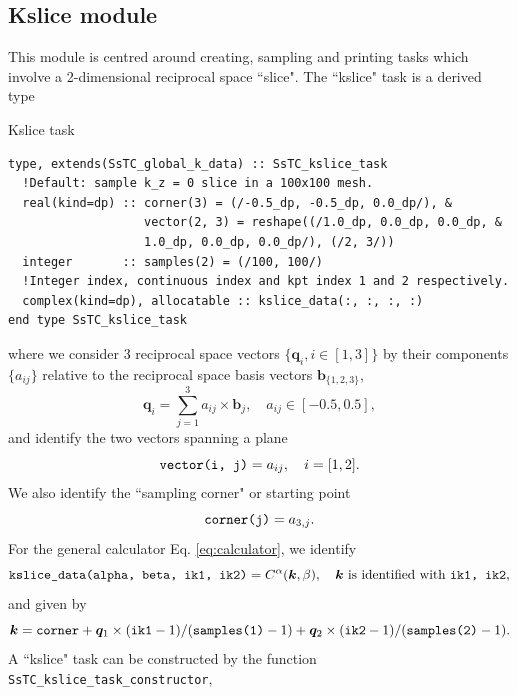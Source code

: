 \documentclass[10pt,a4paper]{article}
\begin{document}
\subsection{Kslice module}
This module is centred around creating, sampling and printing tasks which involve a 2-dimensional reciprocal space ``slice". The ``kslice" task is a derived type
\begin{codebox}{Kslice task}
\begin{lstlisting}[caption={Derived type corresponding to a ``kslice" task.},captionpos=b]
type, extends(SsTC_global_k_data) :: SsTC_kslice_task
  !Default: sample k_z = 0 slice in a 100x100 mesh.
  real(kind=dp) :: corner(3) = (/-0.5_dp, -0.5_dp, 0.0_dp/), &
                   vector(2, 3) = reshape((/1.0_dp, 0.0_dp, 0.0_dp, &
                   1.0_dp, 0.0_dp, 0.0_dp/), (/2, 3/))
  integer       :: samples(2) = (/100, 100/)
  !Integer index, continuous index and kpt index 1 and 2 respectively.
  complex(kind=dp), allocatable :: kslice_data(:, :, :, :)
end type SsTC_kslice_task
\end{lstlisting}
\end{codebox}
where we consider 3 reciprocal space vectors $\{\bm{q}_i, i\in[1, 3]\}$ by their components $\{a_{ij}\}$ relative to the reciprocal space basis vectors $\bm{b}_{\{1, 2, 3\}}$,
\begin{equation}\label{eq:vec_coords_slice}
\bm{q}_i = \sum_{j=1}^3 a_{ij}\times \bm{b}_j, \quad a_{ij}\in\left[-0.5, 0.5\right],
\end{equation}
and identify the two vectors spanning a plane
\begin{equation}
\verb|vector(i, j)| = a_{ij}, \quad i = [1, 2].
\end{equation}
We also identify the ``sampling corner" or starting point
\begin{equation}
\verb|corner(j)| = a_{3, j}.
\end{equation}
For the general calculator Eq. \eqref{eq:calculator}, we identify
\begin{equation}
\verb|kslice_data(alpha, beta, ik1, ik2)| = C^{\alpha}(\bm{k},\beta),\quad \bm{k}\text{ is identified with } \verb|ik1, ik2|,
\end{equation}
and given by
\begin{equation}
\bm{k} = \verb|corner| + \bm{q}_1\times (\verb|ik1|-1)/(\verb|samples(1)| - 1) + \bm{q}_2\times (\verb|ik2|-1)/(\verb|samples(2)| - 1).
\end{equation}
A ``kslice" task can be constructed by the function \verb|SsTC_kslice_task_constructor|,
\end{document}

